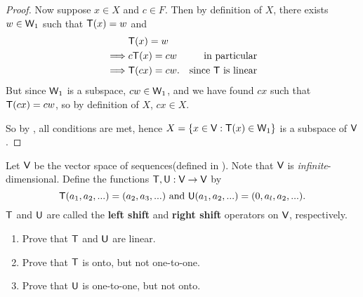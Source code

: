 \begin{proof}
Now suppose \(x \in X\) and \(c \in F\).
Then by definition of \(X\), there exists \(w \in \textsf{W}_1\) such that \(\textsf{T}(x) = w\) and
\begin{align*}
             & \textsf{T}(x) = w \\
    \implies & c\textsf{T}(x) = cw & \text{in particular} \\
    \implies & \textsf{T}(cx) = cw. & \text{since \(\textsf{T}\) is linear}
\end{align*}
But since \(\textsf{W}_1\) is a subspace, \(cw \in \textsf{W}_1\), and we have found \(cx\) such that \(\textsf{T}(cx) = cw\), so by definition of \(X\), \(cx \in X\).

So by , all conditions are met, hence \(X = \{ x \in \textsf{V}: \textsf{T}(x) \in \textsf{W}_1 \}\) is a subspace of \(\textsf{V}\).
\end{proof}

\begin{exercise} \label{exercise 2.1.21}
Let \(\textsf{V}\) be the vector space of sequences(defined in ).
Note that \(\textsf{V}\) is \emph{infinite}-dimensional.
Define the functions \(\textsf{T}, \textsf{U}: \textsf{V} \to \textsf{V}\) by
\[
    \textsf{T}(a_1, a_2, ...) = (a_2, a_3, ...) \text{ and } \textsf{U}(a_1, a_2, ...) = (0, a_l, a_2, ...).
\]
\(\textsf{T}\) and \(\textsf{U}\) are called the \textbf{left shift} and \textbf{right shift} operators on \(\textsf{V}\), respectively.
\begin{enumerate}
\item Prove that \(\textsf{T}\) and \(\textsf{U}\) are linear.
\item Prove that \(\textsf{T}\) is onto, but not one-to-one.
\item Prove that \(\textsf{U}\) is one-to-one, but not onto.
\end{enumerate}
\end{exercise}


